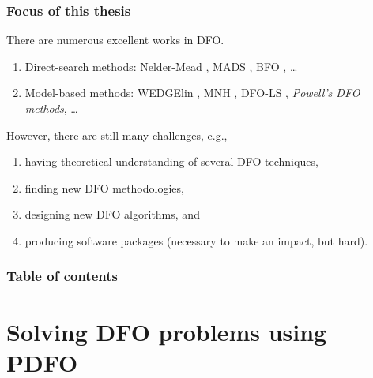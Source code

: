 \documentclass{polyu-presentation}
\begin{document}
\begin{frame}
    \frametitle{Focus of this thesis}

    There are numerous excellent works in DFO.

    \medskip

    \begin{block}{}
        \begin{enumerate}
            \item \alert{Direct-search methods}: Nelder-Mead \parencite{Nelder_Mead_1965}, MADS \parencite{Audet_Dennis_2006}, BFO \parencite{Porcelli_Toint_2017,Porcelli_Toint_2022}, \dots
            \item \alert{Model-based methods}: WEDGElin \parencite{Marazzi_Nocedal_2002}, MNH \parencite{Wild_2008}, DFO-LS \parencite{Cartis_Etal_2019,Hough_Roberts_2022}, \emph{Powell's DFO methods}, \dots
        \end{enumerate}
    \end{block}

    \medskip

    However, there are still many challenges, e.g.,
    \begin{enumerate}
        \item having \alert{theoretical} understanding of several DFO techniques,
        \item finding new DFO \alert{methodologies},
        \item designing new DFO \alert{algorithms}, and
        \item producing \alert{software packages} (necessary to make an impact, but hard).
    \end{enumerate}
\end{frame}

\begin{framenopagination}
    \frametitle{Table of contents}
    
	\tableofcontents[hideallsubsections]
\end{framenopagination}

\section{Solving DFO problems using PDFO}
\end{document}
